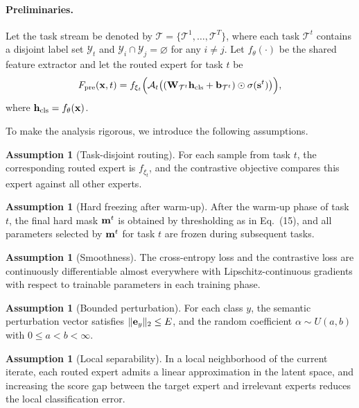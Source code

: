 \documentclass[journal]{IEEEtran}
\theoremstyle{plain}
\theoremstyle{definition}
\newtheorem{assumption}[theorem]{Assumption}
\theoremstyle{remark}
\begin{document}
\paragraph{Preliminaries.}
Let the task stream be denoted by $\mathcal{T}=\{\mathcal{T}^{1},\dots,\mathcal{T}^{T}\}$, where each task $\mathcal{T}^{t}$ contains a disjoint label set $\mathcal{Y}_{t}$ and $\mathcal{Y}_{i}\cap\mathcal{Y}_{j}=\varnothing$ for any $i\neq j$. Let $f_{\theta}(\cdot)$ be the shared feature extractor and let the routed expert for task $t$ be
\begin{equation}
F_{\mathrm{pre}}({\bf x},t)=f_{\xi_t}\Big({\mathcal{A}}_t\big(({\bf W}_{\mathcal{T}^{t}}{\bf h}_{\mathrm{cls}}+{\bf b}_{\mathcal{T}^{t}})\odot \sigma({\bf s}^{t})\big)\Big),
\label{eq:theory-predictor}
\end{equation}
where ${\bf h}_{\mathrm{\rm cls}}=f_{\theta}({\bf x})$.

To make the analysis rigorous, we introduce the following assumptions.

\begin{assumption}[Task-disjoint routing]
For each sample from task $t$, the corresponding routed expert is $f_{\xi_t}$, and the contrastive objective compares this expert against all other experts.
\end{assumption}

\begin{assumption}[Hard freezing after warm-up]
After the warm-up phase of task $t$, the final hard mask ${\bf m}^{t}$ is obtained by thresholding as in Eq.~(15), and all parameters selected by ${\bf m}^{t}$ for task $t$ are frozen during subsequent tasks.
\end{assumption}

\begin{assumption}[Smoothness]
The cross-entropy loss and the contrastive loss are continuously differentiable almost everywhere with Lipschitz-continuous gradients with respect to trainable parameters in each training phase.
\end{assumption}

\begin{assumption}[Bounded perturbation]
For each class $y$, the semantic perturbation vector satisfies $\|{\bf e}_y\|_2\le E$, and the random coefficient $\alpha\sim U(a,b)$ with $0\le a<b<\infty$.
\end{assumption}

\begin{assumption}[Local separability]
In a local neighborhood of the current iterate, each routed expert admits a linear approximation in the latent space, and increasing the score gap between the target expert and irrelevant experts reduces the local classification error.
\end{assumption}
\end{document}
